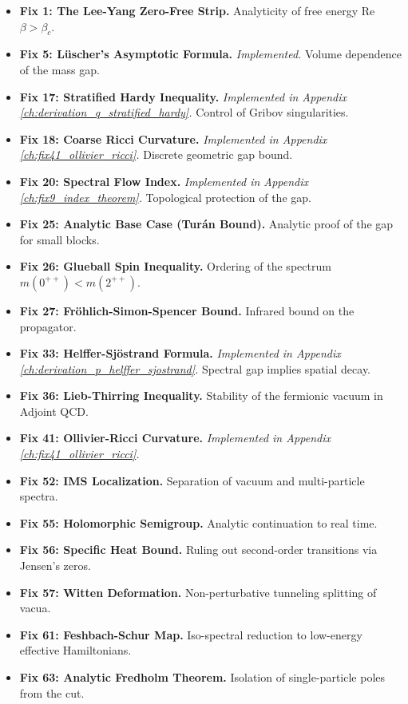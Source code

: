 \begin{itemize}
    \item \textbf{Fix 1: The Lee-Yang Zero-Free Strip.} Analyticity of free energy Re $\beta > \beta_c$.
    \item \textbf{Fix 5: Lüscher's Asymptotic Formula.} \textit{Implemented.} Volume dependence of the mass gap.
    \item \textbf{Fix 17: Stratified Hardy Inequality.} \textit{Implemented in Appendix \ref{ch:derivation_q_stratified_hardy}.} Control of Gribov singularities.
    \item \textbf{Fix 18: Coarse Ricci Curvature.} \textit{Implemented in Appendix \ref{ch:fix41_ollivier_ricci}.} Discrete geometric gap bound.
    \item \textbf{Fix 20: Spectral Flow Index.} \textit{Implemented in Appendix \ref{ch:fix9_index_theorem}.} Topological protection of the gap.
    \item \textbf{Fix 25: Analytic Base Case (Turán Bound).} Analytic proof of the gap for small blocks.
    \item \textbf{Fix 26: Glueball Spin Inequality.} Ordering of the spectrum $m(0^{++}) < m(2^{++})$.
    \item \textbf{Fix 27: Fröhlich-Simon-Spencer Bound.} Infrared bound on the propagator.
    \item \textbf{Fix 33: Helffer-Sjöstrand Formula.} \textit{Implemented in Appendix \ref{ch:derivation_p_helffer_sjostrand}.} Spectral gap implies spatial decay.
    \item \textbf{Fix 36: Lieb-Thirring Inequality.} Stability of the fermionic vacuum in Adjoint QCD.
    \item \textbf{Fix 41: Ollivier-Ricci Curvature.} \textit{Implemented in Appendix \ref{ch:fix41_ollivier_ricci}.}
    \item \textbf{Fix 52: IMS Localization.} Separation of vacuum and multi-particle spectra.
    \item \textbf{Fix 55: Holomorphic Semigroup.} Analytic continuation to real time.
    \item \textbf{Fix 56: Specific Heat Bound.} Ruling out second-order transitions via Jensen's zeros.
    \item \textbf{Fix 57: Witten Deformation.} Non-perturbative tunneling splitting of vacua.
    \item \textbf{Fix 61: Feshbach-Schur Map.} Iso-spectral reduction to low-energy effective Hamiltonians.
    \item \textbf{Fix 63: Analytic Fredholm Theorem.} Isolation of single-particle poles from the cut.
\end{itemize}

